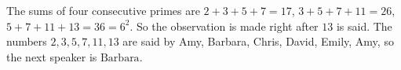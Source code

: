 The sums of four consecutive primes are $2+3+5+7=17$, $3+5+7+11=26$, $5+7+11+13=36=6^2$. So the observation is made right after $13$ is said. The numbers $2,3,5,7,11,13$ are said by Amy, Barbara, Chris, David, Emily, Amy, so the next speaker is $\boxed{\text{Barbara}}$.
